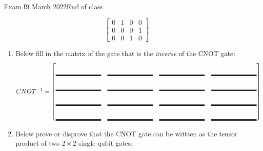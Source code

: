 \documentclass[12pt]{article}
\newcommand{\Blank}{\mbox{\vrule width 1in depth 2pt}\vrule width 0pt height 2.0em}
\begin{document}
\begin{assignment}{Exam I}{9 March 2022}{End of class}
\begin{enumerate}
\[\begin{bmatrix}
0 & 1 & 0 & 0 \\
0 & 0 & 0 & 1 \\
0 & 0 & 1 & 0
\end{bmatrix}
\]
\begin{enumerate}
  \item{} Below fill in the matrix of the gate that is the \emph{inverse} of
the CNOT gate:
\[
CNOT^{-1}=
\begin{bmatrix}
\Blank{} & \Blank{} & \Blank{} & \Blank{}  \\
\Blank{} & \Blank{} & \Blank{} & \Blank{}  \\
\Blank{} & \Blank{} & \Blank{} & \Blank{}  \\
\Blank{} & \Blank{} & \Blank{} & \Blank{} 
\end{bmatrix}
\]
 \item{} Below prove or disprove that the CNOT gate can be written as the
tensor product of two $2\times2$ single qubit gates:
\end{enumerate}

\end{enumerate}

\end{assignment}
\Bpage{}
\end{document}
